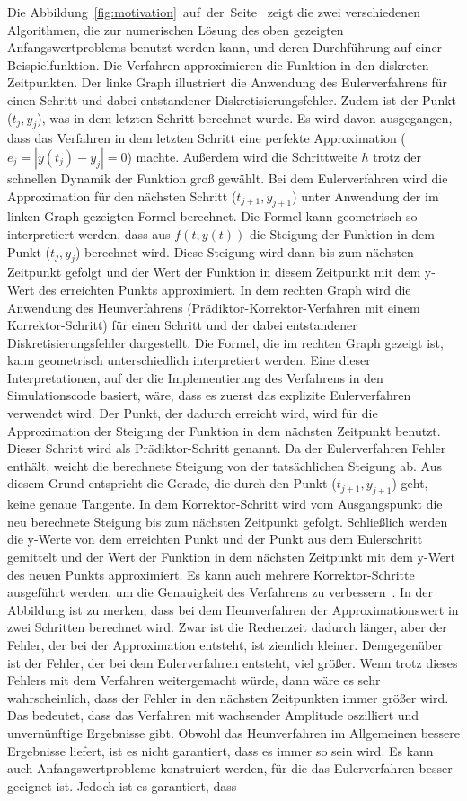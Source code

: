 \documentclass{listhesis}
\begin{document}
Die Abbildung~\ref{fig:motivation}~auf~der~Seite~\pageref{fig:motivation} zeigt die zwei verschiedenen Algorithmen, die zur numerischen Lösung des oben gezeigten Anfangswertproblems benutzt werden kann, und deren Durchführung auf einer Beispielfunktion. Die Verfahren approximieren die Funktion in den diskreten Zeitpunkten. Der linke Graph illustriert die Anwendung des Eulerverfahrens für einen Schritt und dabei entstandener Diskretisierungsfehler. Zudem ist der Punkt ($t_j,y_j$), was in dem letzten Schritt berechnet wurde. Es wird davon ausgegangen, dass das Verfahren in dem letzten Schritt eine perfekte Approximation ($e_j = |y(t_j) - y_j| = 0$) machte. Außerdem wird die Schrittweite $h$ trotz der schnellen Dynamik der Funktion groß gewählt. Bei dem Eulerverfahren wird die Approximation für den nächsten Schritt ($t_{j+1}, y_{j+1}$) unter Anwendung der im linken Graph gezeigten Formel berechnet. Die Formel kann geometrisch so interpretiert werden, dass aus $f(t,y(t))$ die Steigung der Funktion in dem Punkt ($t_j, y_j$) berechnet wird. Diese Steigung wird dann bis zum nächsten Zeitpunkt gefolgt und der Wert der Funktion in diesem Zeitpunkt mit dem y-Wert des erreichten Punkts approximiert. In dem rechten Graph wird die Anwendung des Heunverfahrens (Prädiktor-Korrektor-Verfahren mit einem Korrektor-Schritt) für einen Schritt und der dabei entstandener Diskretisierungsfehler dargestellt. Die Formel, die im rechten Graph gezeigt ist, kann geometrisch unterschiedlich interpretiert werden. Eine dieser Interpretationen, auf der die Implementierung des Verfahrens in den Simulationscode basiert, wäre, dass es zuerst das explizite Eulerverfahren verwendet wird. Der Punkt, der dadurch erreicht wird, wird für die Approximation der Steigung der Funktion in dem nächsten Zeitpunkt benutzt. Dieser Schritt wird als Prädiktor-Schritt genannt. Da der Eulerverfahren Fehler enthält, weicht die berechnete Steigung von der tatsächlichen Steigung ab. Aus diesem Grund entspricht die Gerade, die durch den Punkt ($t_{j+1},y_{j+1}$) geht, keine genaue Tangente. In dem Korrektor-Schritt wird vom Ausgangspunkt die neu berechnete Steigung bis zum nächsten Zeitpunkt gefolgt. Schließlich werden die y-Werte von dem erreichten Punkt und der Punkt aus dem Eulerschritt gemittelt und der Wert der Funktion in dem nächsten Zeitpunkt mit dem y-Wert des neuen Punkts approximiert. Es kann auch mehrere Korrektor-Schritte ausgeführt werden, um die Genauigkeit des Verfahrens zu verbessern~\cite{butcher}. In der Abbildung ist zu merken, dass bei dem Heunverfahren der Approximationswert in zwei Schritten berechnet wird. Zwar ist die Rechenzeit dadurch länger, aber der Fehler, der bei der Approximation entsteht, ist ziemlich kleiner. Demgegenüber ist der Fehler, der bei dem Eulerverfahren entsteht, viel größer. Wenn trotz dieses Fehlers mit dem Verfahren weitergemacht würde, dann wäre es sehr wahrscheinlich, dass der Fehler in den nächsten Zeitpunkten immer größer wird. Das bedeutet, dass das Verfahren mit wachsender Amplitude oszilliert und unvernünftige Ergebnisse gibt. Obwohl das Heunverfahren im Allgemeinen bessere Ergebnisse liefert, ist es nicht garantiert, dass es immer so sein wird. Es kann auch Anfangswertprobleme konstruiert werden, für die das Eulerverfahren besser geeignet ist. Jedoch ist es garantiert, dass 
\end{document}
